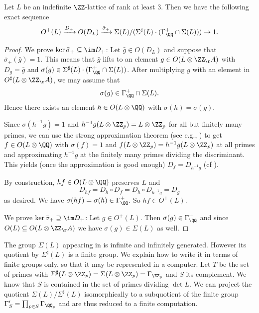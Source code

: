 \begin{theorem}\label{thm:miranda-morrison-signed}
 Let $L$ be an indefinite $\ZZ$-lattice of rank at least $3$. Then we have the following exact sequence
\[O^+(L) \xrightarrow{D_+} O(D_L) \xrightarrow{\bar \sigma_+} \Sigma(L)/(\Sigma^\sharp(L)\cdot (\Gamma_\QQ^+ \cap \Sigma(L))) \to 1. \]
 \end{theorem}
 \begin{proof}
We prove $\ker \bar\sigma_+ \subseteq \im D_+$:
Let $\bar g \in O(D_L)$ and suppose that $\bar\sigma_+(\bar g) = 1$.
This means that $\bar g$ lifts to an element $g \in O(L\otimes \ZZ_\AA)$ with $D_g=\bar g$ and
$\sigma(g)\in \Sigma^\sharp(L)\cdot (\Gamma_\QQ^+ \cap \Sigma(L))$.
After multiplying $g$ with an element in $O^\sharp(L\otimes \ZZ_\AA)$, we may assume that
\[\sigma(g) \in \Gamma_\QQ^+ \cap \Sigma(L).\]
Hence there exists an element $h \in O(L\otimes \QQ)$ with $\sigma(h)=\sigma(g)$.

Since $\sigma(h^{-1}g)=1$ and $h^{-1}g(L\otimes \ZZ_p)=L \otimes \ZZ_p$ for all but finitely many primes, we can use the strong approximation theorem (see e.g.\cite[5.1.3]{KirschmerHabil}, \cite{kneser1966}) to get $f \in O(L\otimes \QQ)$ with $\sigma(f)=1$ and $f(L \otimes {\ZZ_p}) = h^{-1}g(L \otimes {\ZZ_p})$ at all primes and approximating $h^{-1}g$ at the finitely many primes dividing the discriminant. This yields (once the approximation is good enough) $D_f = D_{h^{-1}g}$ (cf \cite[VIII 2.2]{miranda-morrison}).

By construction, $h f \in O(L \otimes \QQ)$ preserves $L$
and \[D_{hf} = D_{h} \circ D_f = D_{h} \circ D_{h^{-1}g} = D_g\]
as desired.
We have $\sigma(hf) = \sigma(h)  \in \Gamma_\QQ^+$. So $hf \in O^+(L)$.

We prove $\ker \bar \sigma_+ \supseteq \im D_+$: Let $ g \in O^+(L)$. Then $\sigma(g) \in \Gamma^+_\QQ$ and since $O(L) \subseteq O(L\otimes \ZZ_\AA)$ we have $\sigma(g) \in \Sigma(L)$ as well.
 \end{proof}

The group $\Sigma(L)$ appearing in  is infinite and infinitely generated. However its quotient
by $\Sigma^\sharp(L)$ is a finite group. We explain how to write it in terms of finite groups only, so that it may be represented in a computer.
Let $T$ be the set of primes with $\Sigma^\sharp(L\otimes \ZZ_p)=\Sigma(L\otimes \ZZ_p)=\Gamma_{\ZZ_p}$ and $S$ its complement. We know that $S$ is contained in the set of primes dividing $\det L$.
We can project the quotient $\Sigma(L)/\Sigma^{\sharp}(L)$ isomorphically
to a subquotient of the finite group $ \Gamma_S' = \prod_{p \in S} \Gamma_{\QQ_p}$ and are thus reduced to a finite computation.

